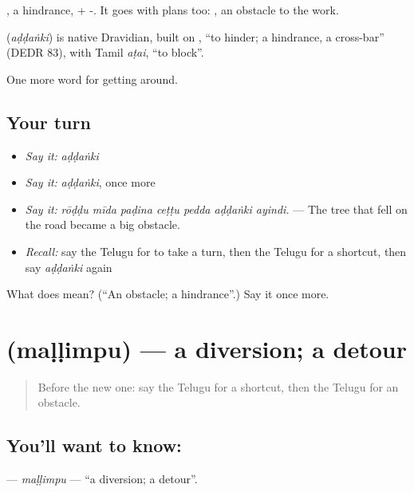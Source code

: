 , a hindrance, + -. It goes with plans too:  , an obstacle to the work.

\begin{cousinweb}
\textbf{} (\emph{aḍḍaṅki}) is native Dravidian, built on , \textquotedblleft{}to hinder; a hindrance, a cross-bar\textquotedblright{} (DEDR 83), with Tamil \emph{aṭai}, \textquotedblleft{}to block\textquotedblright{}.
\end{cousinweb}

\begin{grammarlens}[title={What you've built}]
One more word for getting around.
\end{grammarlens}

\subsection*{Your turn}
\begin{itemize}
\raggedright
  \item \emph{Say it:} \emph{aḍḍaṅki}
  \item \emph{Say it:} \emph{aḍḍaṅki}, once more
  \item \emph{Say it:} \emph{rōḍḍu mīda paḍina ceṭṭu pedda aḍḍaṅki ayindi.} — The tree that fell on the road became a big obstacle.
  \item \emph{Recall:} say the Telugu for to take a turn, then the Telugu for a shortcut, then say \emph{aḍḍaṅki} again
\end{itemize}

\begin{tcolorbox}[breakable,colback=teal!4,colframe=teal!35!black,title={Before you move on}]
What does  mean? (\textquotedblleft{}An obstacle; a hindrance\textquotedblright{}.) Say it once more.
\end{tcolorbox}
\section[\texorpdfstring{\te{మళ్ళింపు} (maḷḷimpu)}{మళ్ళింపు (maḷḷimpu)}]{ (maḷḷimpu) — a diversion; a detour}

\label{lesson:TE-C449-mallimpu}



\begin{quote}
Before the new one: say the Telugu for a shortcut, then the Telugu for an obstacle.
\end{quote}

\subsection*{You'll want to know: }
\textbf{} — \emph{maḷḷimpu} — \textquotedblleft{}a diversion; a detour\textquotedblright{}.

